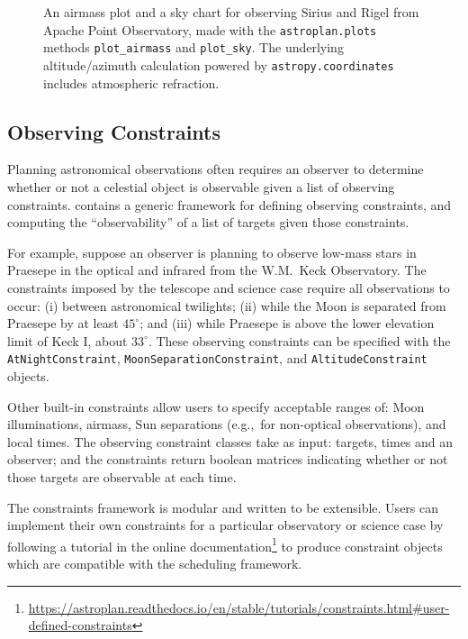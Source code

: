 \begin{figure}
\caption{An airmass plot and a sky chart for observing Sirius and Rigel from Apache Point Observatory, made with the \texttt{astroplan.plots} methods \texttt{plot\_airmass} and \texttt{plot\_sky}. The underlying altitude/azimuth calculation powered by \texttt{astropy.coordinates} includes atmospheric refraction.}
\label{fig:plots}
\end{figure}

\subsection{Observing Constraints} \label{sec:constraints}

Planning astronomical observations often requires an observer to determine whether or not a celestial object is observable given a list of observing constraints. \astroplan contains a generic framework for defining observing constraints, and computing the ``observability'' of a list of targets given those constraints.

For example, suppose an observer is planning to observe low-mass stars in Praesepe in the optical and infrared from the W.M.~Keck Observatory. The constraints imposed by the telescope and science case require all observations to occur: (i) between astronomical twilights; (ii) while the Moon is separated from Praesepe by at least $45^\circ$; and (iii) while Praesepe is above the lower elevation limit of Keck I, about $33^\circ$. These observing constraints can be specified with the \texttt{AtNightConstraint}, \texttt{MoonSeparationConstraint}, and \texttt{AltitudeConstraint} objects. %

Other built-in constraints allow users to specify acceptable ranges of: Moon illuminations, airmass, Sun separations (e.g.,~for non-optical observations), and local times. The observing constraint classes take as input: targets, times and an observer; and the constraints return boolean matrices indicating whether or not those targets are observable at each time. 

The constraints framework is modular and written to be extensible. Users can implement their own constraints for a particular observatory or science case by following a tutorial in the online documentation\footnote{\url{https://astroplan.readthedocs.io/en/stable/tutorials/constraints.html\#user-defined-constraints}} to produce constraint objects which are compatible with the \astroplan scheduling framework.

